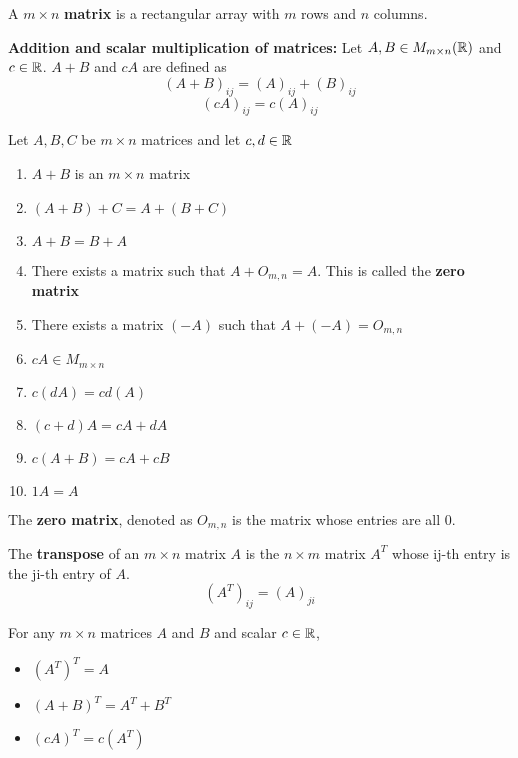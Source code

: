 \documentclass[english, 12pt]{article}
\begin{document}
\begin{defn}
A $m \times n$ \textbf{matrix} is a rectangular array with $m$ rows and $n$ columns.
\end{defn}

\begin{defn}
\textbf{Addition and scalar multiplication of matrices:} Let $A,B \in M_{m \times n} ({\mathbb{R}})$ and $c \in {\mathbb{R}}$. $A+B$ and $cA$ are defined as
\[(A + B)_{ij} = (A)_{ij} + (B)_{ij}\]
\[(cA)_{ij} = c(A)_{ij}\]
\end{defn}

\begin{thrm}
Let $A,B,C$ be $m \times n$ matrices and let $c,d \in {\mathbb{R}}$
\begin{enumerate}
\item $A + B$ is an $m \times n$ matrix
\item $(A + B) + C = A + (B + C)$
\item $A + B = B + A$
\item There exists a matrix such that $A + O_{m,n} = A$. This is called the \textbf{zero matrix}
\item There exists a matrix $(-A)$ such that $A + (-A) = O_{m,n}$
\item $cA \in M_{m \times n}$
\item $c(dA) = cd(A)$
\item $(c + d)A = cA + dA$
\item $c(A + B) = cA + cB$
\item $1A = A$
\end{enumerate}
\end{thrm}

\begin{defn}
The \textbf{zero matrix}, denoted as $O_{m,n}$ is the matrix whose entries are all $0$.
\end{defn}

\begin{defn}
The \textbf{transpose} of an $m \times n$ matrix $A$ is the $n \times m$ matrix $A^T$ whose ij-th entry is the ji-th entry of $A$.
\[ (A^T)_{ij} = (A)_{ji}\]
\end{defn}

\begin{thrm}
For any $m \times n$ matrices $A$ and $B$ and scalar $c \in {\mathbb{R}}$,
\begin{itemize}
\item $(A^T)^T = A$
\item $(A+B)^T = A^T + B^T$
\item $(cA)^T = c(A^T)$
\end{itemize}
\end{thrm}
\end{document}
